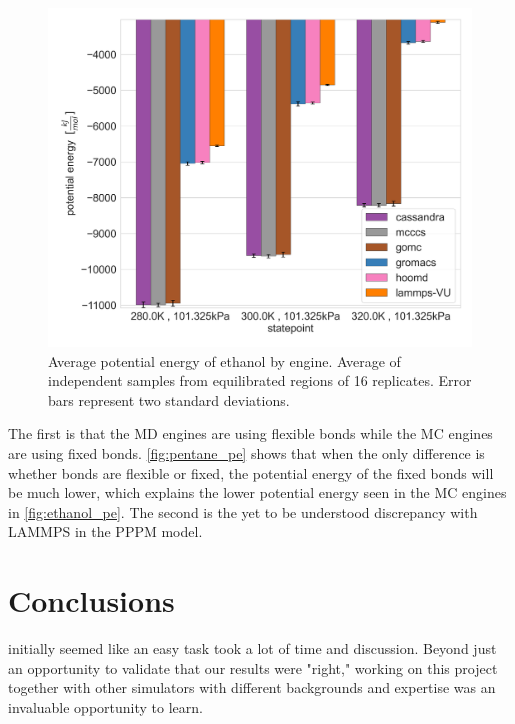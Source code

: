\begin{figure}[h!]
    \centering
    \includegraphics[width=0.8\linewidth,keepaspectratio]{figures/rep_study/ethanolAA_pe_summary.png}
    \caption{Average potential energy of ethanol by engine. Average of independent samples from equilibrated regions of 16 replicates. Error bars represent two standard deviations.}\label{fig:ethanol_pe}
\end{figure}
The first is that the MD engines are using flexible bonds while the MC engines are using fixed bonds.
\autoref{fig:pentane_pe} shows that when the only difference is whether bonds are flexible or fixed, the potential energy of the fixed bonds will be much lower, which explains the lower potential energy seen in the MC engines in \autoref{fig:ethanol_pe}.
The second is the yet to be understood discrepancy with LAMMPS in the PPPM model. 

\section{Conclusions}

initially seemed like an easy task
took a lot of time and discussion.
Beyond just an opportunity to validate that our results were "right," working on this project together with other simulators with different backgrounds and expertise was an invaluable opportunity to learn.
